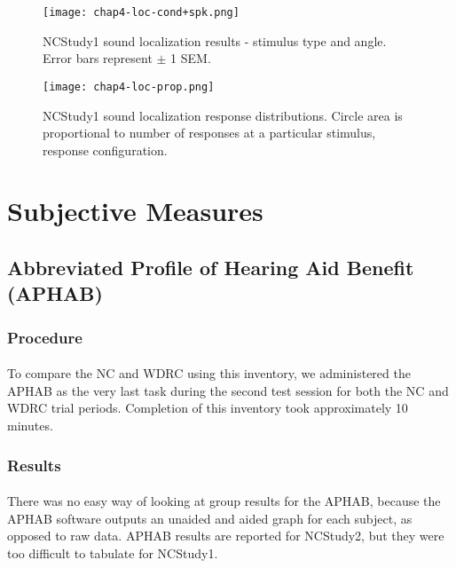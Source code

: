 \begin{figure}[htp]
\begin{center}
\texttt{[image: chap4-loc-cond+spk.png]} \\
\caption[NCStudy1 sound localization results - stimulus type and angle]{NCStudy1 sound localization results - stimulus type and angle.  Error bars represent $\pm$ 1 SEM.}
\label{chap4-loc-cond-spk}
\end{center}
\end{figure}

\begin{figure}[htp]
\begin{center}
\texttt{[image: chap4-loc-prop.png]} \\
\caption[NCStudy1 sound localization results - response distributions]{NCStudy1 sound localization response distributions.  Circle area is proportional to number of responses at a particular stimulus, response configuration.}
\label{chap4-loc-cond-prop}
\end{center}
\end{figure}

\section{Subjective Measures}
\subsection{Abbreviated Profile of Hearing Aid Benefit (APHAB)}
\subsubsection{Procedure}
\paragraph{}To compare the NC and WDRC using this inventory, we administered the APHAB as the very last task during the second test session for both the NC and WDRC trial periods.  Completion of this inventory took approximately 10 minutes.
\subsubsection{Results}
\paragraph{}There was no easy way of looking at group results for the APHAB, because the APHAB software outputs an unaided and aided graph for each subject, as opposed to raw data.  APHAB results are reported for NCStudy2, but they were too difficult to tabulate for NCStudy1.

